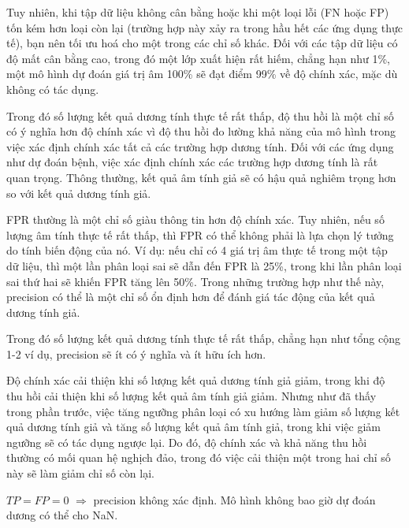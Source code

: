 \documentclass[12pt,a4paper]{article}
\begin{document}
\begin{phanvidu}[title={Trên tập mất cân bằng}]
  Tuy nhiên, khi tập dữ liệu không cân bằng hoặc khi một loại lỗi (FN hoặc FP) tốn kém hơn loại còn lại (trường hợp này xảy ra trong hầu hết các ứng dụng thực tế), bạn nên tối ưu hoá cho một trong các chỉ số khác. Đối với các tập dữ liệu có độ mất cân bằng cao, trong đó một lớp xuất hiện rất hiếm, chẳng hạn như 1\%, một mô hình dự đoán giá trị âm 100\% sẽ đạt điểm 99\% về độ chính xác, mặc dù không có tác dụng.

  Trong đó số lượng kết quả dương tính thực tế rất thấp, độ thu hồi là một chỉ số có ý nghĩa hơn độ chính xác vì độ thu hồi đo lường khả năng của mô hình trong việc xác định chính xác tất cả các trường hợp dương tính. Đối với các ứng dụng như dự đoán bệnh, việc xác định chính xác các trường hợp dương tính là rất quan trọng. Thông thường, kết quả âm tính giả sẽ có hậu quả nghiêm trọng hơn so với kết quả dương tính giả.

  FPR thường là một chỉ số giàu thông tin hơn độ chính xác. Tuy nhiên, nếu số lượng âm tính thực tế rất thấp, thì FPR có thể không phải là lựa chọn lý tưởng do tính biến động của nó. Ví dụ: nếu chỉ có 4 giá trị âm thực tế trong một tập dữ liệu, thì một lần phân loại sai sẽ dẫn đến FPR là 25\%, trong khi lần phân loại sai thứ hai sẽ khiến FPR tăng lên 50\%. Trong những trường hợp như thế này, precision có thể là một chỉ số ổn định hơn để đánh giá tác động của kết quả dương tính giả.

  Trong đó số lượng kết quả dương tính thực tế rất thấp, chẳng hạn như tổng cộng 1-2 ví dụ, precision sẽ ít có ý nghĩa và ít hữu ích hơn.
\end{phanvidu}

\begin{tinhchat}[title={Precision vs recall}]
  Độ chính xác cải thiện khi số lượng kết quả dương tính giả giảm, trong khi độ thu hồi cải thiện khi số lượng kết quả âm tính giả giảm. Nhưng như đã thấy trong phần trước, việc tăng ngưỡng phân loại có xu hướng làm giảm số lượng kết quả dương tính giả và tăng số lượng kết quả âm tính giả, trong khi việc giảm ngưỡng sẽ có tác dụng ngược lại. Do đó, độ chính xác và khả năng thu hồi thường có mối quan hệ nghịch đảo, trong đó việc cải thiện một trong hai chỉ số này sẽ làm giảm chỉ số còn lại.
\end{tinhchat}

\begin{luuy}[title={NaN}]
$TP=FP=0$ $\Rightarrow$ precision không xác định. Mô hình không bao giờ dự đoán dương có thể cho NaN.
\end{luuy}
\end{document}
